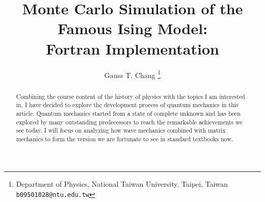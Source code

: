 \documentclass[a4paper, 12pt, oneside, onecolumn]{article}
\begin{document}
\title{Monte Carlo Simulation of the Famous Ising Model:\\Fortran Implementation}
\author{Gauss T. Chang
\thanks{Department of Physics, National Taiwan University, Taipei, Taiwan 
\texttt{b09501028@ntu.edu.tw}}}


\date{}
\maketitle
\begin{abstract}
	Combining the course content of the history of physics with the topics I am interested in, I have decided to explore the development process of quantum mechanics in this article. Quantum mechanics started from a state of complete unknown and has been explored by many outstanding predecessors to reach the remarkable achievements we see today. I will focus on analyzing how wave mechanics combined with matrix mechanics to form the version we are fortunate to see in standard textbooks now.
\end{abstract}
\end{document}
